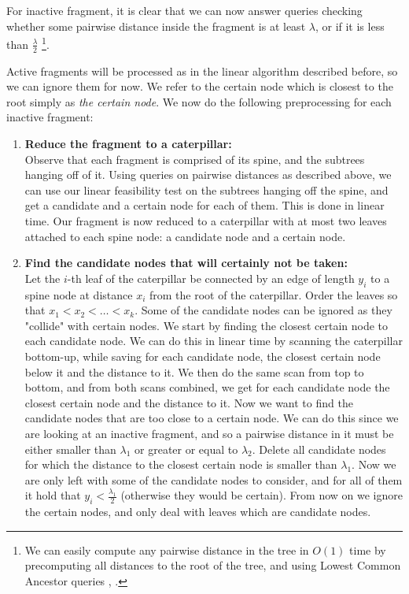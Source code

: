 \documentclass[11pt,a4paper]{article}
\theoremstyle{definition}
\theoremstyle{remark}
\begin{document}
For inactive fragment, it is clear that we can now answer queries checking whether some pairwise distance inside the fragment is at least $\lambda$, or if it is less than $\frac{\lambda}{2}$ \footnote{We can easily compute any pairwise distance in the tree in $O(1)$ time by precomputing all distances to the root of the tree, and using Lowest Common Ancestor queries \cite{Bender2000}, \cite{Djidjev1991}.}.

Active fragments will be processed as in the linear algorithm described before, so we can ignore them for now. We refer to the certain node which is closest to the root simply as \textit{the certain node}. We now do the following preprocessing for each inactive fragment:
\begin{enumerate}
\item\textbf{Reduce the fragment to a caterpillar:}\\
Observe that each fragment is comprised of its spine, and the subtrees hanging off of it. Using queries on pairwise distances as described above, we can use our linear feasibility test on the subtrees hanging off the spine, and get a candidate and a certain node for each of them. This is done in linear time.
Our fragment is now reduced to a caterpillar with at most two leaves attached to each spine node: a candidate
node and a certain node.
\item\label{removing certain nodes}
\textbf{Find the candidate nodes that will certainly not be taken:}\\ %
Let the $i$-th leaf of the caterpillar be connected by an edge of length $y_i$ to a spine node at distance $x_i$ from the root of the caterpillar. Order the leaves so that $x_1 < x_2 < \ldots < x_k$.
Some of the candidate nodes can be ignored as they "collide" with certain nodes. We start by finding the closest certain node to each candidate node. We can do this in linear time by scanning the caterpillar bottom-up, while saving for each candidate node, the closest certain node below it and the distance to it. We then do the same scan from top to bottom, and from both scans combined, we get for each candidate node the closest certain node and the distance to it. Now we want to find the candidate nodes that are too close to a certain node. We can do this since we are looking at an inactive fragment, and so a pairwise distance in it must be either smaller than $\lambda_1$ or greater or equal to $\lambda_2$. Delete all candidate nodes for which the distance to the closest certain node is smaller than $\lambda_1$. 
Now we are only left with some of the candidate nodes to consider, and for all of them it hold that $y_i < \frac{\lambda_1}{2}$ (otherwise they would be certain). From now on we ignore the certain nodes, and only deal with leaves which are candidate nodes.

\end{enumerate}
\end{document}
